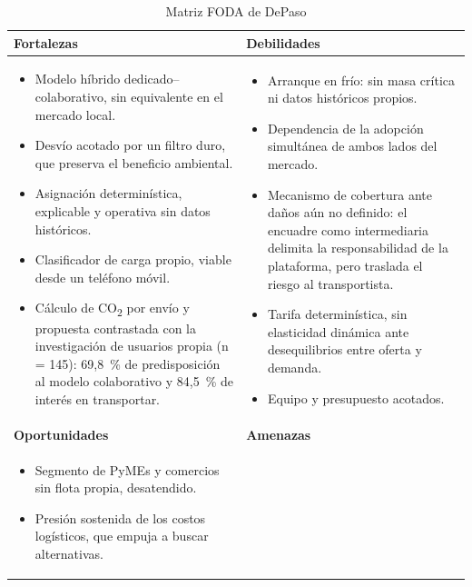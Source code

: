{\begin{table}[H]
    \caption{Matriz FODA de DePaso}
    \label{tab:foda}
    \centering\color{nuevo}
    \small
    \begin{tabular}{p{6.8cm}p{6.8cm}}
        \toprule
        \textbf{Fortalezas} & \textbf{Debilidades} \\
        \midrule
        \begin{itemize}[leftmargin=1.2em,topsep=1pt,itemsep=1pt]
            \item Modelo híbrido dedicado--colaborativo, sin equivalente en el mercado local.
            \item Desvío acotado por un filtro duro, que preserva el beneficio ambiental.
            \item Asignación determinística, explicable y operativa sin datos históricos.
            \item Clasificador de carga propio, viable desde un teléfono móvil.
            \item Cálculo de CO\textsubscript{2} por envío y propuesta contrastada con la investigación de usuarios propia (n = 145): 69,8~\% de predisposición al modelo colaborativo y 84,5~\% de interés en transportar.
        \end{itemize}
        &
        \begin{itemize}[leftmargin=1.2em,topsep=1pt,itemsep=1pt]
            \item Arranque en frío: sin masa crítica ni datos históricos propios.
            \item Dependencia de la adopción simultánea de ambos lados del mercado.
            \item Mecanismo de cobertura ante daños aún no definido: el encuadre como intermediaria delimita la responsabilidad de la plataforma, pero traslada el riesgo al transportista.
            \item Tarifa determinística, sin elasticidad dinámica ante desequilibrios entre oferta y demanda.
            \item Equipo y presupuesto acotados.
        \end{itemize} \\
        \midrule
        \textbf{Oportunidades} & \textbf{Amenazas} \\
        \midrule
        \begin{itemize}[leftmargin=1.2em,topsep=1pt,itemsep=1pt]
            \item Segmento de PyMEs y comercios sin flota propia, desatendido.
            \item Presión sostenida de los costos logísticos, que empuja a buscar alternativas.

\end{itemize}
\end{tabular}
\end{table}}
